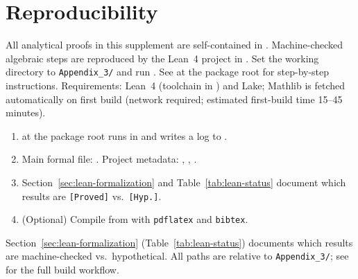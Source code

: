 \documentclass[ecta,nameyear,final,supplement]{econsocart}
\numberwithin{equation}{section}
\numberwithin{table}{section}
\theoremstyle{definition}
\begin{document}
\section{Reproducibility}
\label{sec:repro}

\begin{sloppypar}
All analytical proofs in this supplement are self-contained in
. Machine-checked algebraic steps are reproduced by
the Lean~4 project in . Set the working directory to
\texttt{Appendix\_3/} and run . See  at the
package root for step-by-step instructions. Requirements: Lean~4 (toolchain in
) and Lake; Mathlib is fetched automatically on first
build (network required; estimated first-build time 15--45 minutes).
\end{sloppypar}

\begin{enumerate}
\item {} at the package root runs  in
   and writes a log to .
\item Main formal file: . Project metadata:
  , , .
\item Section~\ref{sec:lean-formalization} and Table~\ref{tab:lean-status}
  document which results are \texttt{[Proved]} vs.\ \texttt{[Hyp.]}.
\item (Optional) Compile  from  with
  \texttt{pdflatex} and \texttt{bibtex}.
\end{enumerate}

\begin{sloppypar}
Section~\ref{sec:lean-formalization} (Table~\ref{tab:lean-status}) documents
which results are machine-checked vs.\ hypothetical. All paths are relative to
\texttt{Appendix\_3/}; see  for the full build workflow.
\end{sloppypar}



\end{document}
